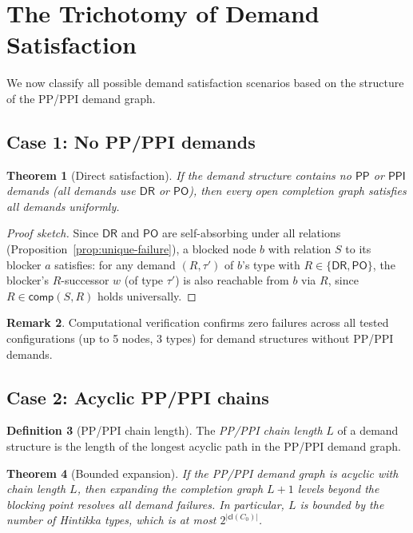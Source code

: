 \documentclass[a4paper,11pt]{article}
\newtheorem{theorem}{Theorem}[section]
\theoremstyle{definition}
\newtheorem{definition}[theorem]{Definition}
\newtheorem{remark}[theorem]{Remark}
\newcommand{\DR}{\ensuremath{\mathsf{DR}}}
\newcommand{\PO}{\ensuremath{\mathsf{PO}}}
\newcommand{\PP}{\ensuremath{\mathsf{PP}}}
\newcommand{\PPI}{\ensuremath{\mathsf{PPI}}}
\newcommand{\comp}{\ensuremath{\mathsf{comp}}}
\newcommand{\cl}{\ensuremath{\mathsf{cl}}}
\begin{document}
\section{The Trichotomy of Demand Satisfaction}
\label{sec:trichotomy}

We now classify all possible demand satisfaction scenarios based
on the structure of the PP/PPI demand graph.

\subsection{Case 1: No PP/PPI demands}

\begin{theorem}[Direct satisfaction]
\label{thm:case1}
If the demand structure contains no $\PP$ or $\PPI$ demands
\textup{(}all demands use $\DR$ or $\PO$\textup{)}, then every
open completion graph satisfies all demands uniformly.
\end{theorem}

\begin{proof}[Proof sketch]
Since $\DR$ and $\PO$ are self-absorbing under all relations
(Proposition~\ref{prop:unique-failure}), a blocked node $b$ with
relation $S$ to its blocker $a$ satisfies: for any demand
$(R, \tau')$ of $b$'s type with $R \in \{\DR, \PO\}$, the
blocker's $R$-successor $w$ (of type $\tau'$) is also reachable
from $b$ via $R$, since $R \in \comp(S, R)$ holds universally.
\end{proof}

\begin{remark}
Computational verification confirms zero failures across all
tested configurations (up to 5 nodes, 3 types) for demand
structures without PP/PPI demands.
\end{remark}

\subsection{Case 2: Acyclic PP/PPI chains}

\begin{definition}[PP/PPI chain length]
The \emph{PP/PPI chain length} $L$ of a demand structure is the
length of the longest acyclic path in the PP/PPI demand graph.
\end{definition}

\begin{theorem}[Bounded expansion]
\label{thm:case2}
If the PP/PPI demand graph is acyclic with chain length $L$, then
expanding the completion graph $L+1$ levels beyond the blocking
point resolves all demand failures.  In particular, $L$ is bounded
by the number of Hintikka types, which is at most $2^{|\cl(C_0)|}$.
\end{theorem}
\end{document}
